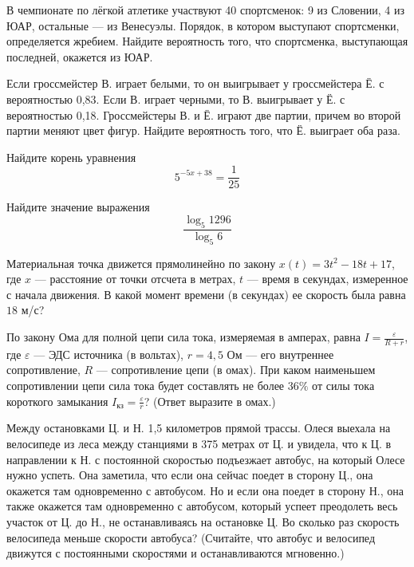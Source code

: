 \documentclass[twocolumn]{article}
\begin{document}
\begin{taskBN}{3}
В чемпионате по лёгкой атлетике участвуют 40 спортсменок: 9 из Словении, 4 из ЮАР, остальные — из Венесуэлы. Порядок, в котором выступают спортсменки, определяется жребием. Найдите вероятность того, что спортсменка, выступающая последней, окажется из ЮАР.
\end{taskBN}

\begin{taskBN}{4}
Если гроссмейстер В. играет белыми, то он выигрывает у гроссмейстера Ё. с вероятностью 0,83. Если В. играет черными, то В. выигрывает у Ё. с вероятностью 0,18. Гроссмейстеры В. и Ё. играют две партии, причем во второй партии меняют цвет фигур. Найдите вероятность того, что Ё. выиграет оба раза.
\end{taskBN}

\begin{taskBN}{5}
Найдите корень уравнения $${5}^{-5x+38}=\frac{1}{25}$$
\end{taskBN}

\begin{taskBN}{6}
Найдите значение выражения $$\frac{\log_{5}{1296}}{\log_{5}{6}} $$
\end{taskBN}

\begin{taskBN}{7}
Материальная точка движется прямолинейно по закону $x(t)=3t^{2}-18t+17$, где $x$ — расстояние от точки отсчета в метрах, $t$ — время в секундах, измеренное с начала движения. В какой момент времени (в секундах) ее скорость была равна $18$ м/с?
\end{taskBN}

\begin{taskBN}{8}
По закону Ома для полной цепи сила тока, измеряемая в амперах, равна $I=\frac{\varepsilon}{R+r}$, где $\varepsilon$ — ЭДС источника (в вольтах), $r= 4{,}5 $ Ом — его внутреннее сопротивление, $R$ — сопротивление цепи (в омах). При каком наименьшем сопротивлении цепи сила тока будет составлять не более $36\%$ от силы тока короткого замыкания $I_{\mbox{кз}}=\frac{\varepsilon}{r}$? (Ответ выразите в омах.)
\end{taskBN}

\begin{taskBN}{9}
Между остановками Ц. и Н. 1,5 километров прямой трассы. Олеся выехала на велосипеде из леса между станциями в 375 метрах от Ц. и увидела, что к Ц. в направлении к Н. с постоянной скоростью подъезжает автобус, на который Олесе нужно успеть. Она заметила, что если она сейчас поедет в сторону Ц., она окажется там одновременно с автобусом. Но и если она поедет в сторону Н., она также окажется там одновременно с автобусом, который успеет преодолеть весь участок от Ц. до Н., не останавливаясь на остановке Ц. Во сколько раз скорость велосипеда меньше скорости автобуса? (Считайте, что автобус и велосипед движутся с постоянными скоростями и останавливаются мгновенно.)
\end{taskBN}
\end{document}
